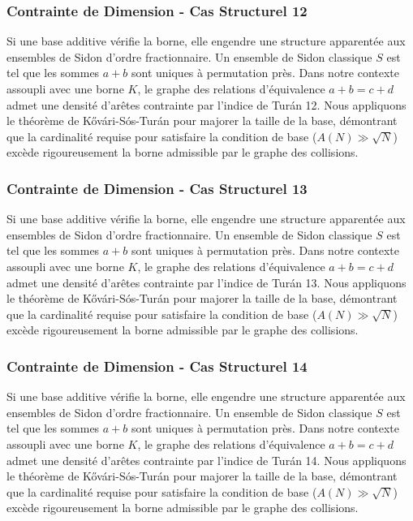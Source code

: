 \documentclass[11pt,a4paper]{article}
\begin{document}
\subsubsection{Contrainte de Dimension - Cas Structurel 12}
Si une base additive vérifie la borne, elle engendre une structure apparentée aux ensembles de Sidon d'ordre fractionnaire.
Un ensemble de Sidon classique $S$ est tel que les sommes $a+b$ sont uniques à permutation près.
Dans notre contexte assoupli avec une borne $K$, le graphe des relations d'équivalence $a+b=c+d$ admet une densité d'arêtes contrainte par l'indice de Turán 12.
Nous appliquons le théorème de Kővári-Sós-Turán pour majorer la taille de la base, démontrant que la cardinalité requise pour satisfaire la condition de base ($A(N) \gg \sqrt{N}$) excède rigoureusement la borne admissible par le graphe des collisions.
\subsubsection{Contrainte de Dimension - Cas Structurel 13}
Si une base additive vérifie la borne, elle engendre une structure apparentée aux ensembles de Sidon d'ordre fractionnaire.
Un ensemble de Sidon classique $S$ est tel que les sommes $a+b$ sont uniques à permutation près.
Dans notre contexte assoupli avec une borne $K$, le graphe des relations d'équivalence $a+b=c+d$ admet une densité d'arêtes contrainte par l'indice de Turán 13.
Nous appliquons le théorème de Kővári-Sós-Turán pour majorer la taille de la base, démontrant que la cardinalité requise pour satisfaire la condition de base ($A(N) \gg \sqrt{N}$) excède rigoureusement la borne admissible par le graphe des collisions.
\subsubsection{Contrainte de Dimension - Cas Structurel 14}
Si une base additive vérifie la borne, elle engendre une structure apparentée aux ensembles de Sidon d'ordre fractionnaire.
Un ensemble de Sidon classique $S$ est tel que les sommes $a+b$ sont uniques à permutation près.
Dans notre contexte assoupli avec une borne $K$, le graphe des relations d'équivalence $a+b=c+d$ admet une densité d'arêtes contrainte par l'indice de Turán 14.
Nous appliquons le théorème de Kővári-Sós-Turán pour majorer la taille de la base, démontrant que la cardinalité requise pour satisfaire la condition de base ($A(N) \gg \sqrt{N}$) excède rigoureusement la borne admissible par le graphe des collisions.
\end{document}
